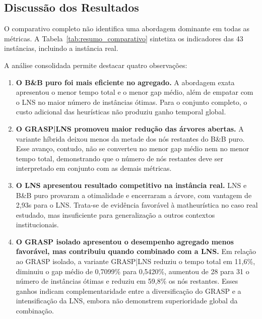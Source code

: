 \subsection{Discussão dos Resultados}

O comparativo completo não identifica uma abordagem dominante em todas as métricas. A Tabela~\ref{tab:resumo_comparativo} sintetiza os indicadores das 43 instâncias, incluindo a instância real.



A análise consolidada permite destacar quatro observações:

\begin{enumerate}
  \item \textbf{O B\&B puro foi mais eficiente no agregado.} A abordagem exata apresentou o menor tempo total e o menor gap médio, além de empatar com o LNS no maior número de instâncias ótimas. Para o conjunto completo, o custo adicional das heurísticas não produziu ganho temporal global.

  \item \textbf{O GRASP|LNS promoveu maior redução das árvores abertas.} A variante híbrida deixou menos da metade dos nós restantes do B\&B puro. Esse avanço, contudo, não se converteu no menor gap médio nem no menor tempo total, demonstrando que o número de nós restantes deve ser interpretado em conjunto com as demais métricas.

  \item \textbf{O LNS apresentou resultado competitivo na instância real.} LNS e B\&B puro provaram a otimalidade e encerraram a árvore, com vantagem de 2,93s para o LNS. Trata-se de evidência favorável à matheurística no caso real estudado, mas insuficiente para generalização a outros contextos institucionais.

  \item \textbf{O GRASP isolado apresentou o desempenho agregado menos favorável, mas contribuiu quando combinado com a LNS.} Em relação ao GRASP isolado, a variante GRASP|LNS reduziu o tempo total em 11,6\%, diminuiu o gap médio de 0,7099\% para 0,5420\%, aumentou de 28 para 31 o número de instâncias ótimas e reduziu em 59,8\% os nós restantes. Esses ganhos indicam complementaridade entre a diversificação do GRASP e a intensificação da LNS, embora não demonstrem superioridade global da combinação.
\end{enumerate}
